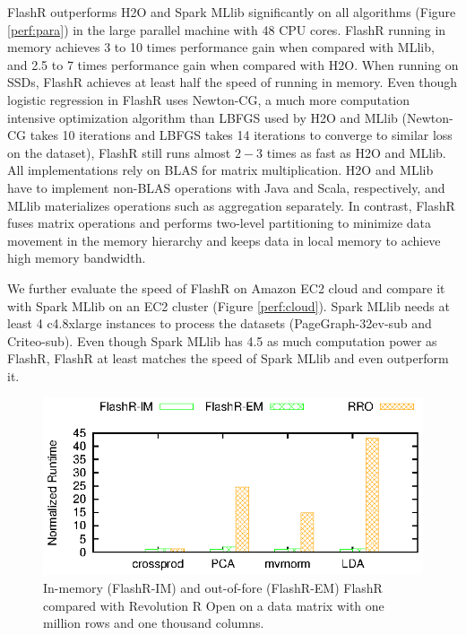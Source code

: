 FlashR outperforms H2O and Spark MLlib significantly on all algorithms
(Figure \ref{perf:para}) in the large parallel machine with 48 CPU cores.
FlashR running in memory achieves 3 to 10 times performance gain when compared
with MLlib, and 2.5 to 7 times performance gain when compared with H2O.
When running on SSDs, FlashR achieves at least half the speed of running in
memory. Even though logistic regression in FlashR uses Newton-CG, a much more
computation intensive optimization algorithm than LBFGS \cite{lbfgs} used by
H2O and MLlib (Newton-CG takes 10 iterations and LBFGS takes 14 iterations
to converge to similar loss on the dataset), FlashR still runs almost $2-3$
times as fast as H2O and MLlib. All implementations rely on BLAS for
matrix multiplication. H2O and MLlib have to
implement non-BLAS operations with Java and Scala, respectively, and
MLlib materializes operations such as aggregation separately. In contrast,
FlashR fuses matrix operations and performs two-level partitioning to
minimize data movement in the memory hierarchy and keeps data in local
memory to achieve high memory bandwidth.

We further evaluate the speed of FlashR on Amazon EC2 cloud and compare it with
Spark MLlib on an EC2 cluster (Figure \ref{perf:cloud}). Spark MLlib needs
at least 4 c4.8xlarge instances to process the datasets (PageGraph-32ev-sub
and Criteo-sub).
Even though Spark MLlib has 4.5 as much computation power as FlashR, FlashR
at least matches the speed of Spark MLlib and even outperform it.

\begin{figure}[b]
  \vspace{-10pt}
	\begin{center}
		\footnotesize
		\includegraphics{FlashMatrix_figs/FlashR-vs-RRO.eps}
		\caption{In-memory (FlashR-IM) and out-of-fore (FlashR-EM) FlashR
		compared with Revolution R Open on a data matrix with one million rows
		and one thousand columns.}
		\label{fig:fmR}
	\end{center}
  \vspace{-15pt}
\end{figure}

